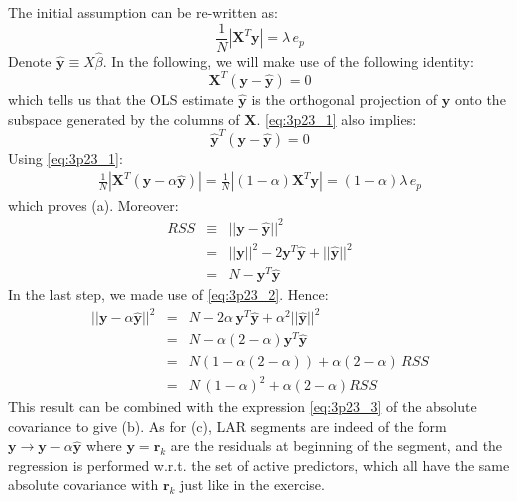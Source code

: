 

The initial assumption can be re-written as:
\begin{equation}
\frac{1}{N} \left| \mathbf{X}^T \mathbf{y}\right| = \lambda\,e_p
\end{equation}
Denote $\hat{\mathbf{y}} \equiv X \hat{\beta}$. In the following,
we will make use of the following identity:
\begin{equation}\label{eq:3p23_1}
\mathbf{X}^T \left(\mathbf{y} - \hat{\mathbf{y}}\right) = 0
\end{equation}
which tells us that the OLS estimate $\hat{\mathbf{y}}$ is the
orthogonal projection of $\mathbf{y}$ onto the subspace generated
by the columns of $\mathbf{X}$. \eqref{eq:3p23_1} also implies:
\begin{equation}\label{eq:3p23_2}
\hat{\mathbf{y}}^T \left(\mathbf{y} - \hat{\mathbf{y}}\right) = 0
\end{equation}
Using \eqref{eq:3p23_1}:
\begin{eqnarray*} \label{eq:3p23_3}
    \frac{1}{N} \left|\mathbf{X}^T \left(\mathbf{y} - \alpha \hat{\mathbf{y}}\right)\right| = 
    \frac{1}{N} \left|(1 - \alpha) \mathbf{X}^T \mathbf{y}\right| = 
    (1 - \alpha) \lambda\, e_p
\end{eqnarray*}
which proves (a). Moreover:
\begin{eqnarray*}
    RSS & \equiv & || \mathbf{y} - \hat{\mathbf{y}} ||^2 \\
      & = & ||\mathbf{y}||^2 - 2 \mathbf{y}^T \hat{\mathbf{y}} + 
        ||\hat{\mathbf{y}}||^2 \\
    & = & N - \mathbf{y}^T \hat{\mathbf{y}}
\end{eqnarray*}
In the last step, we made use of \eqref{eq:3p23_2}. Hence:
\begin{eqnarray*}
    ||\mathbf{y} - \alpha \hat{\mathbf{y}}||^2 & = & 
        N - 2 \alpha\,\mathbf{y}^T \hat{\mathbf{y}} + \alpha^2 ||\hat{\mathbf{y}}||^2 \\
        & = & N - \alpha \left(2 - \alpha\right) \mathbf{y}^T \hat{\mathbf{y}} \\
        & = & N \left(1 - \alpha(2 - \alpha)\right) + \alpha(2 - \alpha)\, RSS \\
        & = & N\, (1 - \alpha)^2 + \alpha(2 - \alpha) RSS
\end{eqnarray*}
This result can be combined with the expression \eqref{eq:3p23_3}
of the absolute covariance to give (b). As for (c), LAR segments
are indeed of the form 
$ \mathbf{y} \rightarrow \mathbf{y} - \alpha \hat{\mathbf{y}}$
where $\mathbf{y} = \mathbf{r}_k$ are the residuals at beginning of the 
segment, and the regression is performed w.r.t. the set of active 
predictors, which all have the same absolute covariance with $\mathbf{r}_k$ just like in the exercise.


